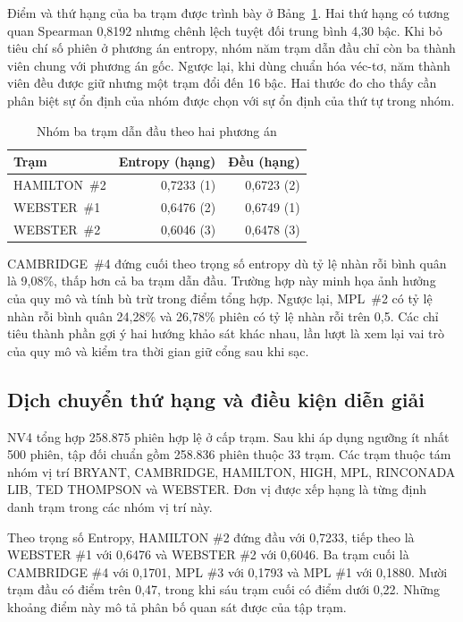 \documentclass[conference,a4paper]{IEEEtran}
\begin{document}
Điểm và thứ hạng của ba trạm được trình bày ở Bảng~\ref{tab:stations}. Hai thứ hạng có tương quan Spearman 0,8192 nhưng chênh lệch tuyệt đối trung bình 4,30 bậc. Khi bỏ tiêu chí số phiên ở phương án entropy, nhóm năm trạm dẫn đầu chỉ còn ba thành viên chung với phương án gốc. Ngược lại, khi dùng chuẩn hóa véc-tơ, năm thành viên đều được giữ nhưng một trạm đổi đến 16 bậc. Hai thước đo cho thấy cần phân biệt sự ổn định của nhóm được chọn với sự ổn định của thứ tự trong nhóm.

\begin{table}[!t]
\caption{Nhóm ba trạm dẫn đầu theo hai phương án}
\label{tab:stations}
\centering\footnotesize
\begin{tabularx}{\columnwidth}{@{}Xrr@{}}
\toprule
\textbf{Trạm} & \textbf{Entropy (hạng)} & \textbf{Đều (hạng)} \\
\midrule
HAMILTON~\#2 & 0,7233 (1) & 0,6723 (2) \\
WEBSTER~\#1 & 0,6476 (2) & 0,6749 (1) \\
WEBSTER~\#2 & 0,6046 (3) & 0,6478 (3) \\
\bottomrule
\end{tabularx}
\end{table}

CAMBRIDGE~\#4 đứng cuối theo trọng số entropy dù tỷ lệ nhàn rỗi bình quân là 9,08\%, thấp hơn cả ba trạm dẫn đầu. Trường hợp này minh họa ảnh hưởng của quy mô và tính bù trừ trong điểm tổng hợp. Ngược lại, MPL~\#2 có tỷ lệ nhàn rỗi bình quân 24,28\% và 26,78\% phiên có tỷ lệ nhàn rỗi trên 0,5. Các chỉ tiêu thành phần gợi ý hai hướng khảo sát khác nhau, lần lượt là xem lại vai trò của quy mô và kiểm tra thời gian giữ cổng sau khi sạc.

\subsection{Dịch chuyển thứ hạng và điều kiện diễn giải}

NV4 tổng hợp 258.875 phiên hợp lệ ở cấp trạm. Sau khi áp dụng ngưỡng ít nhất 500 phiên, tập đối chuẩn gồm 258.836 phiên thuộc 33 trạm. Các trạm thuộc tám nhóm vị trí BRYANT, CAMBRIDGE, HAMILTON, HIGH, MPL, RINCONADA LIB, TED THOMPSON và WEBSTER. Đơn vị được xếp hạng là từng định danh trạm trong các nhóm vị trí này.

Theo trọng số Entropy, HAMILTON \#2 đứng đầu với 0,7233, tiếp theo là WEBSTER \#1 với 0,6476 và WEBSTER \#2 với 0,6046. Ba trạm cuối là CAMBRIDGE \#4 với 0,1701, MPL \#3 với 0,1793 và MPL \#1 với 0,1880. Mười trạm đầu có điểm trên 0,47, trong khi sáu trạm cuối có điểm dưới 0,22. Những khoảng điểm này mô tả phân bố quan sát được của tập trạm.
\end{document}
